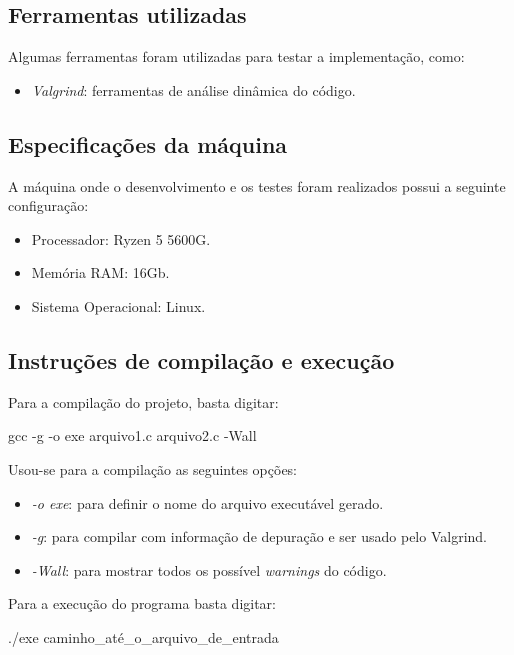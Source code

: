 \documentclass{article}
\begin{document}
\subsection{Ferramentas utilizadas}
Algumas ferramentas foram utilizadas para testar a implementação, como:
\begin{itemize}
    \item[-] \textit{Valgrind}: ferramentas de análise dinâmica do código.
\end{itemize}

\subsection{Especificações da máquina}
A máquina onde o desenvolvimento e os testes foram realizados possui a seguinte configuração:
\begin{itemize}
    \item[-] Processador: Ryzen 5 5600G.
    \item[-] Memória RAM: 16Gb.
    \item[-] Sistema Operacional: Linux.
\end{itemize}

\subsection{Instruções de compilação e execução}

Para a compilação do projeto, basta digitar:

\begin{tcolorbox}[title=Compilando o projeto,width=\linewidth]
    gcc -g -o exe arquivo1.c arquivo2.c -Wall
\end{tcolorbox}

Usou-se para a compilação as seguintes opções:
\begin{itemize}
    \item [-] \emph{-o exe}: para definir o nome do arquivo executável gerado.
    \item [-] \emph{-g}: para compilar com informação de depuração e ser usado pelo Valgrind.
    \item [-] \emph{-Wall}: para mostrar todos os possível \emph{warnings} do código.
\end{itemize}

Para a execução do programa basta digitar:
\begin{tcolorbox}[title=,width=\linewidth]
    ./exe caminho\_até\_o\_arquivo\_de\_entrada
\end{tcolorbox}
\end{document}

